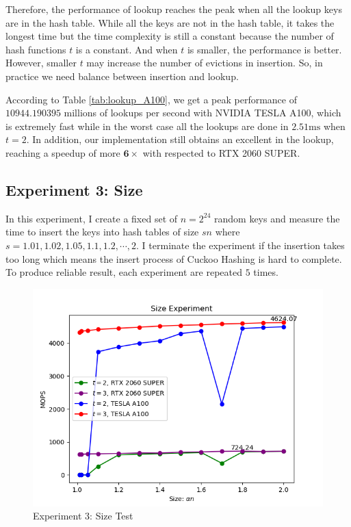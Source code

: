 \documentclass[10pt,twocolumn,letterpaper]{article}
\begin{document}
Therefore, the performance of lookup reaches the peak when all the lookup keys are in the hash table. While all the keys are not in the hash table, it takes the longest time but the time complexity is still a constant because the number of hash functions $t$ is a constant. And when $t$ is smaller, the performance is better. However, smaller $t$ may increase the number of evictions in insertion. So, in practice we need balance between insertion and lookup.

According to Table \ref{tab:lookup_A100}, we get a peak performance of $\mathbf{10944.190395}$ millions of lookups per second with NVIDIA TESLA A100, which is extremely fast while in the worst case all the lookups are done in $2.51\text{ms}$ when $t = 2$. In addition, our implementation still obtains an excellent in the lookup, reaching a speedup of more $\mathbf{6 \times}$ with respected to RTX 2060 SUPER.

\subsection{Experiment 3: Size}

In this experiment, I create a fixed set of $n = 2^{24}$ random keys and measure the time to insert the keys into hash tables of size $sn$ where $s = 1.01, 1.02, 1.05, 1.1, 1.2, \cdots, 2$. I terminate the experiment if the insertion takes too long which means the insert process of Cuckoo Hashing is hard to complete. To produce reliable result, each experiment are repeated $5$ times.

\begin{figure}[!h]
    \centering
    \includegraphics[scale=0.5]{figures/3.png}
    \caption{Experiment 3: Size Test}
    \label{fig:experiment3}
\end{figure}
\end{document}
